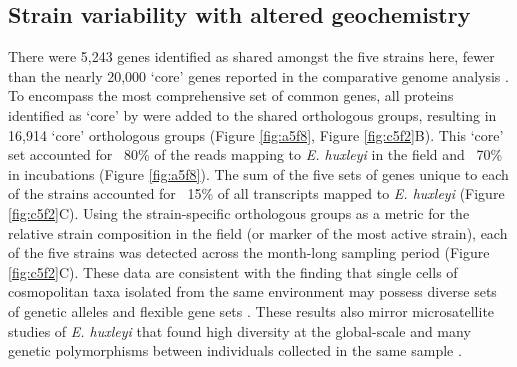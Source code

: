 \subsection{Strain variability with altered geochemistry}

There were 5,243 genes identified as shared amongst the five strains here, fewer than the nearly 20,000 `core' genes reported in the comparative genome analysis \citep{Read2013}. To encompass the most comprehensive set of common genes, all proteins identified as `core' by \citet{Read2013} were added to the shared orthologous groups, resulting in 16,914 `core' orthologous groups (Figure \ref{fig:a5f8}, Figure \ref{fig:c5f2}B). This `core' set accounted for ~80\% of the reads mapping to \textit{E. huxleyi} in the field and ~70\% in incubations (Figure \ref{fig:a5f8}). The sum of the five sets of genes unique to each of the strains accounted for ~15\% of all transcripts mapped to \textit{E. huxleyi} (Figure \ref{fig:c5f2}C). Using the strain-specific orthologous groups as a metric for the relative strain composition in the field (or marker of the most active strain), each of the five strains was detected across the month-long sampling period (Figure \ref{fig:c5f2}C).  These data are consistent with the finding that single cells of cosmopolitan taxa isolated from the same environment may possess diverse sets of genetic alleles and flexible gene sets \citep{Kashtan2014}. These results also mirror microsatellite studies of \textit{E. huxleyi} that found high diversity at the global-scale and many genetic polymorphisms between individuals collected in the same sample \citep{Iglesias-Rodriguez2006}. \par

